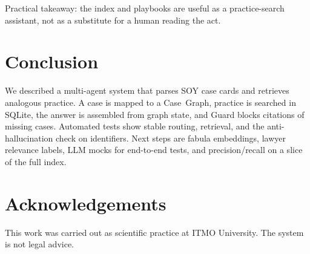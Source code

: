 \documentclass[preprint,12pt]{elsarticle}
\begin{document}
Practical takeaway: the index and playbooks are useful as a practice-search assistant, not as a substitute for a human reading the act.

\section{Conclusion}

We described a multi-agent system that parses SOY case cards and retrieves analogous practice. A case is mapped to a Case~Graph, practice is searched in SQLite, the answer is assembled from graph state, and Guard blocks citations of missing cases. Automated tests show stable routing, retrieval, and the anti-hallucination check on identifiers. Next steps are fabula embeddings, lawyer relevance labels, LLM mocks for end-to-end tests, and precision/recall on a slice of the full index.

\section*{Acknowledgements}

This work was carried out as scientific practice at ITMO University. The system is not legal advice.



\end{document}
